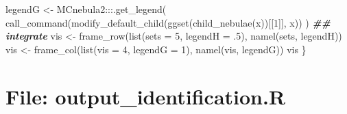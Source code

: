 \documentclass[
]{article}
\newenvironment{Shaded}{\begin{snugshade}}{\end{snugshade}}
\newcommand{\AttributeTok}[1]{\textcolor[rgb]{0.77,0.63,0.00}{#1}}
\newcommand{\DecValTok}[1]{\textcolor[rgb]{0.00,0.00,0.81}{#1}}
\newcommand{\DocumentationTok}[1]{\textcolor[rgb]{0.56,0.35,0.01}{\textbf{\textit{#1}}}}
\newcommand{\FunctionTok}[1]{\textcolor[rgb]{0.00,0.00,0.00}{#1}}
\newcommand{\NormalTok}[1]{#1}
\newcommand{\OtherTok}[1]{\textcolor[rgb]{0.56,0.35,0.01}{#1}}
\newcommand{\SpecialCharTok}[1]{\textcolor[rgb]{0.00,0.00,0.00}{#1}}
\begin{document}
\begin{Shaded}
\begin{Highlighting}[]
\NormalTok{  legendG }\OtherTok{\textless{}{-}}\NormalTok{ MCnebula2}\SpecialCharTok{:::}\FunctionTok{.get\_legend}\NormalTok{(}
    \FunctionTok{call\_command}\NormalTok{(}\FunctionTok{modify\_default\_child}\NormalTok{(}\FunctionTok{ggset}\NormalTok{(}\FunctionTok{child\_nebulae}\NormalTok{(x))[[}\DecValTok{1}\NormalTok{]], x))}
\NormalTok{  )}
  \DocumentationTok{\#\# integrate}
\NormalTok{  vis }\OtherTok{\textless{}{-}} \FunctionTok{frame\_row}\NormalTok{(}\FunctionTok{list}\NormalTok{(}\AttributeTok{sets =} \DecValTok{5}\NormalTok{, }\AttributeTok{legendH =}\NormalTok{ .}\DecValTok{5}\NormalTok{), }\FunctionTok{namel}\NormalTok{(sets, legendH))}
\NormalTok{  vis }\OtherTok{\textless{}{-}} \FunctionTok{frame\_col}\NormalTok{(}\FunctionTok{list}\NormalTok{(}\AttributeTok{vis =} \DecValTok{4}\NormalTok{, }\AttributeTok{legendG =} \DecValTok{1}\NormalTok{), }\FunctionTok{namel}\NormalTok{(vis, legendG))}
\NormalTok{  vis}
\NormalTok{\}}
\end{Highlighting}
\end{Shaded}

\hypertarget{file-output_identification.r}{%
\section{File: output\_identification.R}\label{file-output_identification.r}}
\end{document}

